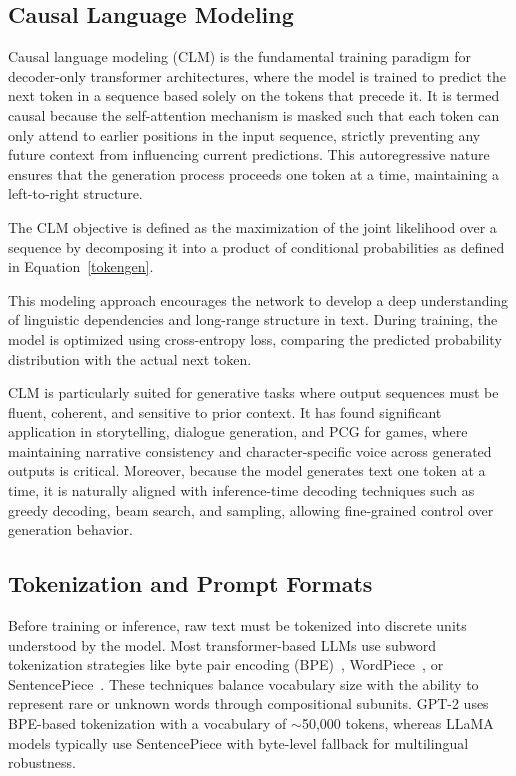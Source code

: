 \subsection{Causal Language Modeling}

Causal language modeling (CLM) is the fundamental training paradigm for decoder-only
transformer architectures, where the model is trained to predict the next token in a
sequence based solely on the tokens that precede it. It is termed causal because the self-attention
mechanism is masked such that each token can only attend to earlier positions
in the input sequence, strictly preventing any future context from influencing current
predictions. This autoregressive nature ensures that the generation process proceeds one
token at a time, maintaining a left-to-right structure.

The CLM objective is defined as the maximization of the joint likelihood over a sequence
by decomposing it into a product of conditional probabilities as defined in Equation~\ref{tokengen}.

This modeling approach encourages the network to develop a deep understanding of
linguistic dependencies and long-range structure in text. During training, the model is
optimized using cross-entropy loss, comparing the predicted probability distribution with
the actual next token.

CLM is particularly suited for generative tasks where output sequences must be fluent,
coherent, and sensitive to prior context. It has found significant application in storytelling,
dialogue generation, and PCG for games, where maintaining narrative consistency and
character-specific voice across generated outputs is critical. Moreover, because the model
generates text one token at a time, it is naturally aligned with inference-time decoding
techniques such as greedy decoding, beam search, and sampling, allowing fine-grained
control over generation behavior.

\subsection{Tokenization and Prompt Formats}

Before training or inference, raw text must be tokenized into discrete units understood
by the model. Most transformer-based LLMs use subword tokenization strategies like
byte pair encoding (BPE)~\cite{shibata1999byte}, WordPiece~\cite{song2020fast}, or SentencePiece~\cite{kudo2018sentencepiece}. These techniques
balance vocabulary size with the ability to represent rare or unknown words through compositional
subunits. GPT-2 uses BPE-based tokenization with a vocabulary of $\sim$50,000
tokens, whereas LLaMA models typically use SentencePiece with byte-level fallback for
multilingual robustness.

